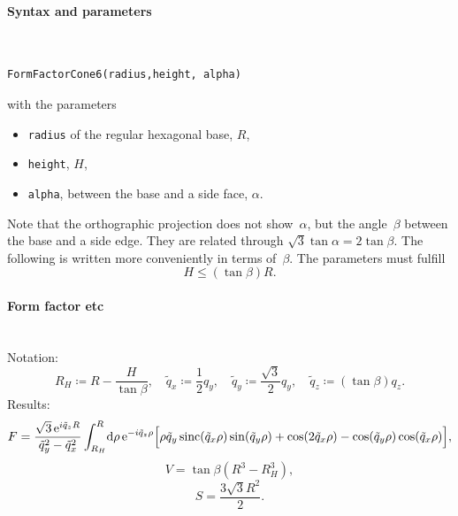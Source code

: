 \FloatBarrier
\paragraph{Syntax and parameters}\strut\\[-2ex plus .2ex minus .2ex]
\begin{lstlisting}[language=python, style=eclipseboxed,numbers=none,nolol]
  FormFactorCone6(radius,height, alpha)
\end{lstlisting}
with the parameters
\begin{itemize}
\item \texttt{radius} of the regular hexagonal base, $R$,
\item \texttt{height}, $H$,
\item \texttt{alpha}, between the base and a side face, $\alpha$.
\end{itemize}
Note that the orthographic projection does not show~$\alpha$,
but the angle~$\beta$ between the base and a side edge.
They are related through $\sqrt{3}\tan \alpha = 2 \tan \beta$.
The following is written more conveniently in terms of~$\beta$.
The parameters must fulfill
\begin{displaymath}
  H \le (\tan\beta)R.
\end{displaymath}

\paragraph{Form factor etc}\strut\\
Notation:
\begin{equation*}
  R_H \coloneqq R-\frac{H}{\tan\beta},\quad
  \tilde{q}_x \coloneqq \frac{1}{2}q_y,\quad
  \tilde{q}_y \coloneqq \frac{\sqrt{3}}{2}q_y,\quad
  \tilde{q}_z \coloneqq (\tan\beta) q_z.
\end{equation*}
Results:
\begin{equation*}
  F = \frac{\sqrt{3}\, \text{e}^{i\tilde q_z R}}{\tilde q_y ^2 - \tilde q_x^2}
    \int_{R_H}^R\!\text{d}\rho\, \text{e}^{-i\tilde q_z \rho}
\Big[\rho\tilde q_y \operatorname{sinc}(\tilde q_x\rho)\sin(\tilde q_y\rho)
+\cos(2\tilde q_x\rho)-\cos(\tilde q_y \rho)\cos(\tilde q_x\rho) \Big],
\end{equation*}
\begin{equation*}
  V = \tan\beta  \left( R^3- R_H^3 \right),
\end{equation*}
\begin{equation*}
  S =\dfrac{3\sqrt{3}R^2}{2}.
\end{equation*}

